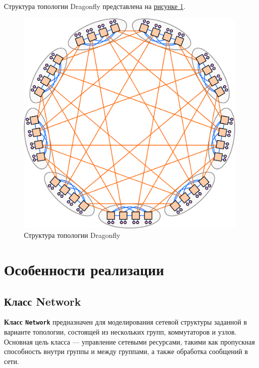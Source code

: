 \documentclass[11pt,a4paper,final]{article} %
\begin{document}
\par Структура топологии Dragonfly представлена на \hyperref[fig:pic1]{рисунке 1}.
\newpage
\begin{figure}[H]
	\centering
	\includegraphics[width=0.8\linewidth]{pic1.png}
	\caption{Структура топологии Dragonfly}
	\label{fig:pic1}
\end{figure}





\newpage
\section{Особенности реализации}

\subsection{Класс Network}

\textbf{Класс \texttt{Network}} предназначен для моделирования сетевой структуры заданной в варианте топологии, состоящей из нескольких групп, коммутаторов и узлов. Основная цель класса — управление сетевыми ресурсами, такими как пропускная способность внутри группы и между группами, а также обработка сообщений в сети.
\end{document}
